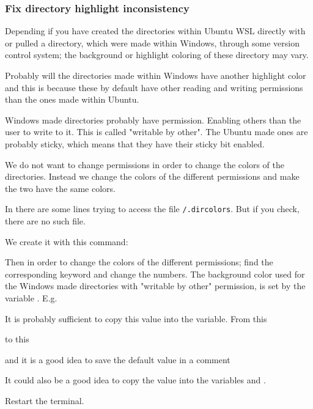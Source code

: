 \subsubsection{Fix directory highlight inconsistency}\label{sec:color_dir_highlight}

Depending if you have created the directories within Ubuntu WSL directly with  or pulled a directory, which were made within Windows, through some version control system; the background or highlight coloring of these directory may vary.

Probably will the directories made within Windows have another highlight color and this is because these by default have other reading and writing permissions than the ones made within Ubuntu. 

Windows made directories probably have  permission. Enabling others than the user to write to it. This is called "writable by other". The Ubuntu made ones are probably sticky, which means that they have their sticky bit enabled.

We do not want to change permissions in order to change the colors of the directories. Instead we change the colors of the different permissions and make the two have the same colors.

In  there are some lines trying to access the file \texttt{\textapprox /.dircolors}. But if you check, there are no such file.

We create it with this command:


Then in order to change the colors of the different permissions; find the corresponding keyword and change the numbers. The background color used for the Windows made directories with "writable by other" permission, is set by the variable . E.g.


It is probably sufficient to copy this value into the  variable. From this


to this


and it is a good idea to save the default value in a comment


It could also be a good idea to copy the value into the variables  and .

Restart the terminal.
